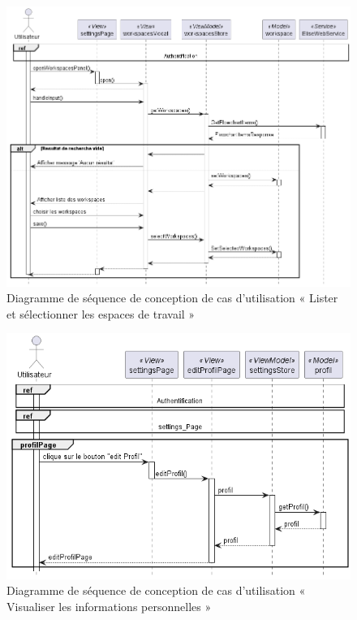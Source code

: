 \begin{figure}[H]
  \centering
  \includegraphics[width=1\textwidth]{out/diagrams/sprint6/sequence_lister_selectionner_workspaces/sequence_lister_selectionner_workspaces}
  \caption{Diagramme de séquence de conception de cas d'utilisation « Lister et sélectionner les espaces de travail »}
  \label{fig:conception_sequence_lister_selectionner_workspaces}
\end{figure}

\begin{figure}[H]
  \centering
  \includegraphics[width=1\textwidth]{out/diagrams/sprint6/sequence_visualiser_profil/sequence_visualiser_profil}
  \caption{Diagramme de séquence de conception de cas d'utilisation «  Visualiser les informations personnelles »}
  \label{fig:conception_sequence_visualiser_profil}
\end{figure}

